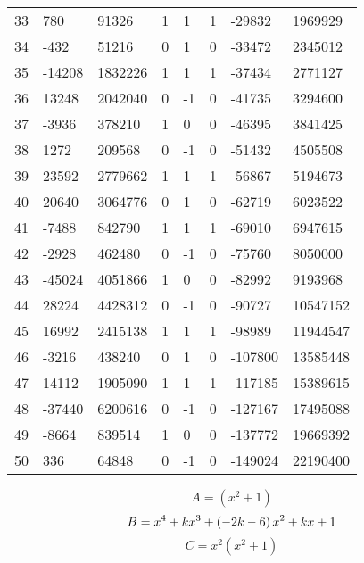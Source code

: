 \documentclass{amsart}
\begin{document}
\begin{longtable}{|l|l|l|lllll|}
33&780&91326&1&1&1&-29832&1969929\\
34&-432&51216&0&1&0&-33472&2345012\\
35&-14208&1832226&1&1&1&-37434&2771127\\
36&13248&2042040&0&-1&0&-41735&3294600\\
37&-3936&378210&1&0&0&-46395&3841425\\
38&1272&209568&0&-1&0&-51432&4505508\\
39&23592&2779662&1&1&1&-56867&5194673\\
40&20640&3064776&0&1&0&-62719&6023522\\
41&-7488&842790&1&1&1&-69010&6947615\\
42&-2928&462480&0&-1&0&-75760&8050000\\
43&-45024&4051866&1&0&0&-82992&9193968\\
44&28224&4428312&0&-1&0&-90727&10547152\\
45&16992&2415138&1&1&1&-98989&11944547\\
46&-3216&438240&0&1&0&-107800&13585448\\
47&14112&1905090&1&1&1&-117185&15389615\\
48&-37440&6200616&0&-1&0&-127167&17495088\\
49&-8664&839514&1&0&0&-137772&19669392\\
50&336&64848&0&-1&0&-149024&22190400\\
\hline
\end{longtable}
$$A=(x^2
 + 1)$$
$$B=x^4
 + k\*x^3
 + \left(-2\*k
 - 6\right) \*x^2
 + k\*x
 + 1$$
$$C=x^2(x^2
 + 1)$$
\end{document}
